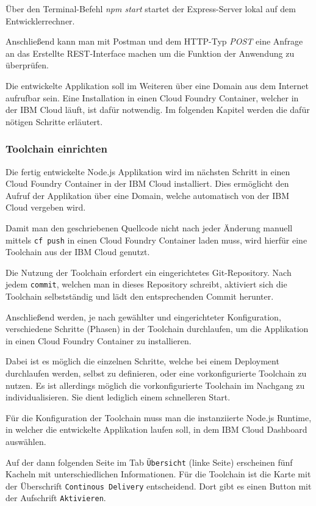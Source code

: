 Über den Terminal-Befehl \textit{npm start} startet der Express-Server lokal auf dem Entwicklerrechner.

Anschließend kann man mit Postman und dem HTTP-Typ \textit{POST} eine Anfrage an das Erstellte REST-Interface machen um
die Funktion der Anwendung zu überprüfen.

Die entwickelte Applikation soll im Weiteren über eine Domain aus dem Internet aufrufbar sein. Eine Installation in
einen Cloud Foundry Container, welcher in der IBM Cloud läuft, ist dafür notwendig. Im folgenden Kapitel werden die
dafür nötigen Schritte erläutert.

\subsubsection{Toolchain einrichten}
\label{sub:tollchain_einrichten}
Die fertig entwickelte Node.js Applikation wird im nächsten Schritt in einen Cloud Foundry Container in der IBM Cloud
installiert. Dies ermöglicht den Aufruf der Applikation über eine Domain, welche automatisch von der IBM Cloud vergeben
wird.

Damit man den geschriebenen Quellcode nicht nach jeder Änderung manuell mittels \texttt{cf push} in einen Cloud Foundry
Container laden muss, wird hierfür eine Toolchain aus der IBM Cloud genutzt.

Die Nutzung der Toolchain erfordert ein eingerichtetes Git-Repository. Nach jedem \texttt{commit}, welchen man in dieses
Repository schreibt, aktiviert sich die Toolchain selbstständig und lädt den entsprechenden Commit herunter.

Anschließend werden, je nach gewählter und eingerichteter Konfiguration, verschiedene Schritte (Phasen) in der Toolchain
durchlaufen, um die Applikation in einen Cloud Foundry Container zu installieren.

Dabei ist es möglich die einzelnen Schritte, welche bei einem Deployment durchlaufen werden, selbst zu definieren, oder
eine vorkonfigurierte Toolchain zu nutzen. Es ist allerdings möglich die vorkonfigurierte Toolchain im Nachgang zu
individualisieren. Sie dient lediglich einem schnelleren Start.

Für die Konfiguration der Toolchain muss man die instanziierte Node.js Runtime, in welcher die entwickelte Applikation
laufen soll, in dem IBM Cloud Dashboard auswählen.

Auf der dann folgenden Seite im Tab \texttt{Übersicht} (linke Seite) erscheinen fünf Kacheln mit unterschiedlichen
Informationen. Für die Toolchain ist die Karte mit der Überschrift \texttt{Continous Delivery} entscheidend. Dort gibt
es einen Button mit der Aufschrift \texttt{Aktivieren}.

